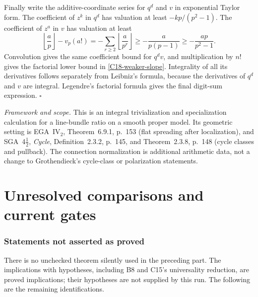 \documentclass[11pt]{article}
\newcommand{\framework}[1]{\par\smallskip\noindent\textit{Framework and scope.} #1\par}
\theoremstyle{definition}\newtheorem{definition}[theorem]{Definition}\newtheorem{remark}[theorem]{Remark}
\begin{document}
Finally write the additive-coordinate series for $q^d$ and $v$ in
exponential Taylor form.  The coefficient of $z^k$ in $q^d$ has
valuation at least $-kp/(p^2-1)$.  The coefficient of $z^a$ in $v$
has valuation at least
\[
 \left\lfloor\frac ap\right\rfloor-v_p(a!)
  =-\sum_{r\geq2}\left\lfloor\frac a{p^r}\right\rfloor
  \geq-\frac{a}{p(p-1)}
  \geq-\frac{ap}{p^2-1}.
\]
Convolution gives the same coefficient bound for $q^dv$, and
multiplication by $n!$ gives the factorial lower bound in
\eqref{C18-weaker-slope}.  Integrality of all its derivatives follows
separately from Leibniz's formula, because the derivatives of $q^d$
and $v$ are integral.  Legendre's factorial formula gives the final
digit-sum expression. \hfill$\square$

\framework{This is an integral trivialization and specialization
calculation for a line-bundle ratio on a smooth proper model.
Its geometric setting is EGA~IV$_2$, Theorem~6.9.1, p.~153
(flat spreading after localization), and SGA~4$\frac12$,
\emph{Cycle}, Definition~2.3.2, p.~145, and Theorem~2.3.8,
p.~148 (cycle classes and pullback). The connection normalization
is additional arithmetic data, not a change to Grothendieck's
cycle-class or polarization statements.}


\part{Unresolved comparisons and current gates}
\section{Statements not asserted as proved}

There is no unchecked theorem silently used in the preceding part.
The implications with hypotheses, including B8 and C15's universality
reduction, are proved implications; their hypotheses are not supplied
by this run. The following are the remaining identifications.
\end{document}
